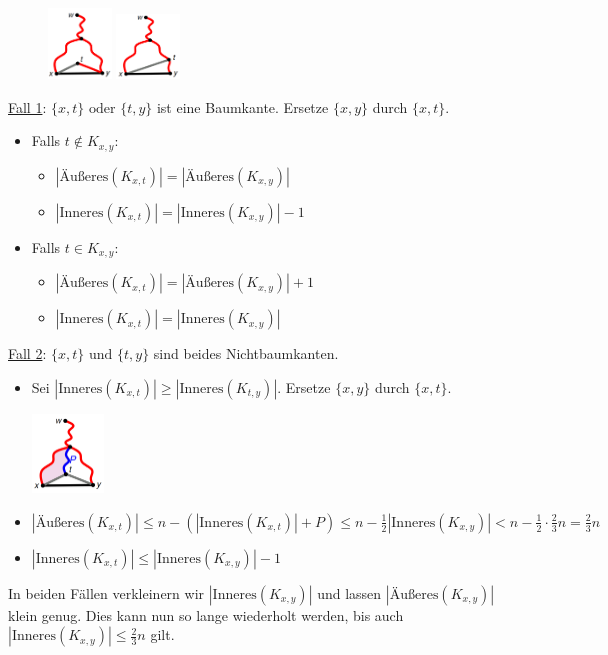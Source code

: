 \begin{figure}
	\centering
	\vspace{0pt}
	\includegraphics[width=0.15\textwidth]{images/pst-3.png}
	\includegraphics[width=0.15\textwidth]{images/pst-4.png}
	\vspace{40pt}
	\vspace{-800pt}
\end{figure}

\underline{Fall 1}: $\{x,t\}\text{ oder } \{t,y\}$ ist eine Baumkante. Ersetze $\{x,y\}$ durch  $\{x,t\}$.
\begin{itemize}
	\item Falls $t\notin K_{x,y}$:
	\begin{itemize}
		\item $|\text{Äußeres}(K_{x,t})|=|\text{Äußeres}(K_{x,y})|$
		\item $|\text{Inneres}(K_{x,t})|=|\text{Inneres}(K_{x,y})|-1$
	\end{itemize}
	\item Falls $t\in K_{x,y}$:
	\begin{itemize}
		\item $|\text{Äußeres}(K_{x,t})|=|\text{Äußeres}(K_{x,y})|+1$
		\item $|\text{Inneres}(K_{x,t})|=|\text{Inneres}(K_{x,y})|$
	\end{itemize}
\end{itemize}
\bigskip
\underline{Fall 2}: $\{x,t\}\text{ und } \{t,y\}$ sind beides Nichtbaumkanten.
\begin{itemize}
	\item Sei $|\text{Inneres}(K_{x,t})|\geq |\text{Inneres}(K_{t,y})|$. Ersetze $\{x,y\}$ durch  $\{x,t\}$.
	\begin{center}
		\includegraphics[width=0.15\textwidth]{images/pst-5.png}
	\end{center}
	\item $|\text{Äußeres}(K_{x,t})|\leq n-(|\text{Inneres}(K_{x,t})|+P)\leq n-\frac{1}{2}|\text{Inneres}(K_{x,y})|< n-\frac{1}{2}\cdot\frac{2}{3}n=\frac{2}{3}n$
	\item $|\text{Inneres}(K_{x,t})|\leq|\text{Inneres}(K_{x,y})|-1$
\end{itemize}
\bigskip
In beiden Fällen verkleinern wir $|\text{Inneres}(K_{x,y})|$ und lassen $|\text{Äußeres}(K_{x,y})|$ klein genug. Dies kann nun so lange wiederholt werden, bis auch $|\text{Inneres}(K_{x,y})| \leq \frac{2}{3}n$ gilt.

